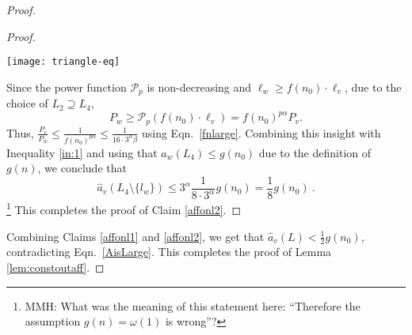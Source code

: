 \documentclass[11pt]{amsart}
\newcommand{\cal}[1]{\mathcal{#1}}
\def\calP{{\cal P}}
\def\calP{{\cal P}}   \def\calM{{\cal M}}   \def\calU{{\cal U}}   \newcommand{\PCopt}{\overline{OPT}}
\newcommand{\powp}{\calP_p}
\begin{document}
\begin{proof}
\begin{proof}
\iffalse
\begin{align}   
a_{v}(L_4 \setminus \{\ell_w\}) 
&\leq
\sum_{\ell_u \in L_4 \setminus \{\ell_w\}} c_u\cdot \frac{P_v}{d(s_v, r_u)^{\alpha}} \frac{\ell_u^{\alpha}}{P_u} 
\nonumber\\
& \leq 
  3^{\alpha} \sum_{u} \frac{P_v}{P_w} \frac{P_w}{d(s_w, r_u)^{\alpha}} \frac{\ell_u^{\alpha}}{P_u}
\nonumber\\
&= 3^{\alpha} \frac{P_v}{P_w} a_w(L_4)\ .
\label{in:1} 
\end{align} 
\fi  

\iffalse
\begin{eqnarray} 
a_{v}(L_4 \setminus \{l_w\}) & \leq\sum_{l_u \in L_4 \setminus \{l_w\}} \frac{P_v}{d(s_v, r_u)^{\alpha}} \frac{\ell_u^{\alpha}}{P_u} 
  \leq   3^{\alpha} \sum_{u} \frac{P_v}{P_w} \frac{P_w}{d(s_w, r_u)^{\alpha}} \frac{\ell_u^{\alpha}}{P_u}
  \nonumber\\
& = 3^{\alpha} \frac{P_v}{P_w} \sum_{u} a_w(u) = 3^{\alpha} \frac{P_v}{P_w} a_w(L_4 \setminus {l_w})\ . \label{in:1}
\end{eqnarray} 
\fi
\begin{figure*}[ht]
	\begin{center}
		\texttt{[image: triangle-eq]}
	\end{center}
	\caption{Nodes $s_v,s_w$ and $r_u$ play the role described in the proof. Here, $L_2:=\{l_u,l_w,l_x\}, L_3:=\{l_x\}$ and $L_4:=\{l_u,l_w\}$. The red dotted lines indicate the relevant distances in the triangle inequality yielding $d(s_v,r_u)\geq \frac{1}{3}d(s_w,r_u)$.}\label{fig:triangle-eq}
\end{figure*}




Since the power function $\powp$ is non-decreasing and $\ell_w\geq f(n_0)\cdot \ell_v$, due to the choice of $L_2\supseteq L_4$, 
\[P_ w \geq \powp(f(n_0) \cdot
\ell_v) = f(n_0)^{p\alpha} P_v.\]
Thus, $\frac{P_v}{P_w} \leq \frac1{f(n_0)^{p\alpha}} \leq \frac{1}{16 \cdot 3^{\alpha}\beta}$ using Eqn.\ \ref{fnlarge}.
Combining this insight with Inequality \ref{in:1} and using that $a_{w}(L_4) \leq g(n_0)$ due to the definition of $g(n)$, we conclude that
\[ \hat{a}_{v}(L_4  \setminus \{l_w\}) 
\le  3^\alpha \frac1{8 \cdot 3^{\alpha}} g(n_0)
      = \frac{1}{8} g(n_0) \ . \]
\footnote{MMH: What was the meaning of this statement here: ``Therefore the assumption $g(n)=\omega(1)$ is wrong''?}
This completes the proof of Claim \ref{affonl2}.
\end{proof}

Combining Claims \ref{affonl1} and \ref{affonl2},
we get that $\hat{a}_v(L) < \frac{1}{2} g(n_0)$, 
contradicting Eqn.\ \ref{AisLarge}. 
This completes the proof of Lemma \ref{lem:constoutaff}.
\end{proof}
\end{document}
